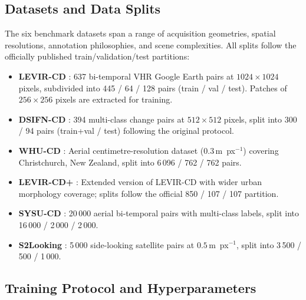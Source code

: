 \subsection{Datasets and Data Splits}

The six benchmark datasets span a range of acquisition geometries, spatial resolutions, annotation philosophies, and scene complexities. All splits follow the officially published train/validation/test partitions:
\begin{itemize}
\item \textbf{LEVIR-CD} \cite{Zheng2020LEVIR}: 637 bi-temporal \ac{VHR} Google Earth pairs at $1024 \times 1024$ pixels, subdivided into 445 / 64 / 128 pairs (train / val / test). Patches of $256 \times 256$ pixels are extracted for training.
\item \textbf{DSIFN-CD} \cite{Zhang2020FusionNetDSIFN}: 394 multi-class change pairs at $512 \times 512$ pixels, split into 300 / 94 pairs (train+val / test) following the original protocol.
\item \textbf{WHU-CD} \cite{Ji2019WHU}: Aerial centimetre-resolution dataset ($0.3\,\mathrm{m}$~px$^{-1}$) covering Christchurch, New Zealand, split into 6\,096 / 762 / 762 pairs.
\item \textbf{LEVIR-CD+} \cite{LevirCDPlus}: Extended version of LEVIR-CD with wider urban morphology coverage; splits follow the official 850 / 107 / 107 partition.
\item \textbf{SYSU-CD} \cite{ShiSYSU2022}: 20\,000 aerial bi-temporal pairs with multi-class labels, split into 16\,000 / 2\,000 / 2\,000.
\item \textbf{S2Looking} \cite{ShenS2Looking2021}: 5\,000 side-looking satellite pairs at $0.5\,\mathrm{m}$~px$^{-1}$, split into 3\,500 / 500 / 1\,000.
\end{itemize}

\subsection{Training Protocol and Hyperparameters}

